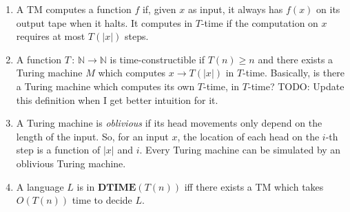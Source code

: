 \documentclass[12pt]{article}
\begin{document}
\begin{enumerate}
{\begin{itemize}
\end{itemize} 
}
\item{A TM computes a function $f$ if, given $x$ as input, it always has $f(x)$ on its output tape when it halts. It computes in $T$-time if the computation on $x$ requires at most $T(|x|)$ steps.}
\item{
A function $T \,:\, \mathbb{N} \rightarrow \mathbb{N}$ is time-constructible if $T(n) \geq n$ and there exists a Turing machine $M$ which computes $x \rightarrow T(|x|)$ in $T$-time. Basically, is there a Turing machine which computes its own $T$-time, in $T$-time? TODO: Update this definition when I get better intuition for it.
}
\item{
A Turing machine is \textit{oblivious} if its head movements only depend on the length of the input. So, for an input $x$, the location of each head on the $i$-th step is a function of $|x|$ and $i$. Every Turing machine can be simulated by an oblivious Turing machine.
}
\item{A language $L$ is in $\textbf{DTIME}(T(n))$ iff there exists a TM which takes $O(T(n))$ time to decide $L$.}
\end{enumerate}
\end{document}
